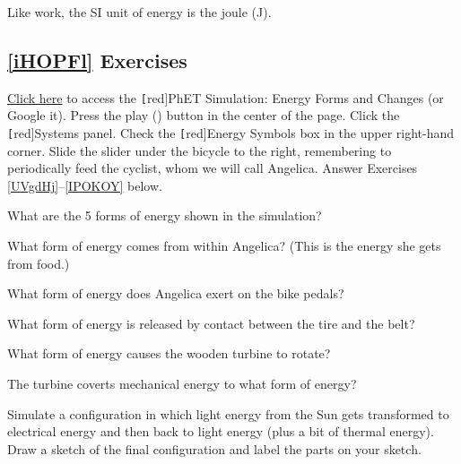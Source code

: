 \documentclass{article}
\numberwithin{equation}{section}
\numberwithin{figure}{section}
\begin{document}
Like work, the SI unit of energy is the joule (J).

\cyanhrule

\subsection*{\ref{iHOPFl} Exercises}

\href{https://phet.colorado.edu/en/simulations/energy-forms-and-changes}{Click here} to access the \texttt[red]{PhET Simulation: Energy Forms and Changes} (or Google it). Press the play ({\tiny \faPlay}) button in the center of the page. Click the \texttt[red]{Systems} panel. Check the \texttt[red]{Energy Symbols} box in the upper right-hand corner. Slide the slider under the bicycle to the right, remembering to periodically feed the cyclist, whom we will call Angelica. Answer Exercises \ref{UVgdHj}--\ref{IPOKOY} below.


\begin{exercise} \label{UVgdHj}
    What are the 5 forms of energy shown in the simulation?
\end{exercise}

\begin{exercise}
    What form of energy comes from within Angelica? (This is the energy she gets from food.)
\end{exercise}

\begin{exercise}
    What form of energy does Angelica exert on the bike pedals?
\end{exercise}

\begin{exercise}
    What form of energy is released by contact between the tire and the belt? 
\end{exercise}

\begin{exercise}
    What form of energy causes the wooden turbine to rotate?
\end{exercise}

\begin{exercise}
    The turbine coverts mechanical energy to what form of energy?
\end{exercise}

\begin{exercise}
    Simulate a configuration in which light energy from the Sun gets transformed to electrical energy and then back to light energy (plus a bit of thermal energy). Draw a sketch of the final configuration and label the parts on your sketch.
\end{exercise}
\end{document}
